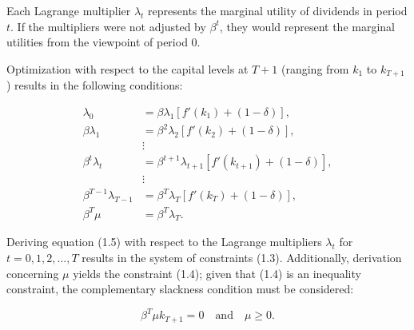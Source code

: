 \documentclass[12pt]{article}
\begin{document}
Each Lagrange multiplier \(\lambda_t\) represents the marginal utility of dividends in period \(t\). If the
multipliers were not  adjusted by \(\beta^t\), they would represent the marginal utilities from the viewpoint of period
0.

Optimization with respect to the capital levels at \(T+1\) (ranging from \(k_1\) to \(k_{T+1}\)) results in the following conditions:

\begin{equation}
    \begin{aligned}
        \lambda_0 &= \beta \lambda_1 \left[ f'(k_1) + (1 - \delta) \right], \\
        \beta \lambda_1 &= \beta^2 \lambda_2 \left[ f'(k_2) + (1 - \delta) \right], \\
        & \vdots \\
        \beta^t \lambda_t &= \beta^{t+1} \lambda_{t+1} \left[ f'(k_{t+1}) + (1 - \delta) \right], \\
        & \vdots \\
        \beta^{T-1} \lambda_{T-1} &= \beta^T \lambda_T \left[ f'(k_T) + (1 - \delta) \right], \\
        \beta^T \mu &= \beta^T \lambda_T.
    \end{aligned}
\end{equation}



Deriving equation (1.5) with respect to the Lagrange multipliers \(\lambda_t\) for \(t=0,1,2,\ldots,T\) results in the
system  of constraints (1.3). Additionally, derivation concerning \(\mu\) yields the constraint (1.4); given that (1.4)
is an inequality constraint, the complementary slackness condition must be considered:

\[
\beta^T \mu k_{T+1} = 0 \quad \text{and} \quad \mu \geq 0.
\]
\end{document}

